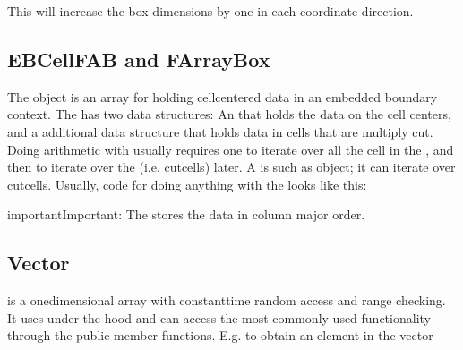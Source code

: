 \documentclass[letterpaper,10pt,english]{sphinxmanual}
\begin{document}
\sphinxAtStartPar
This will increase the box dimensions by one in each coordinate direction.


\subsection{EBCellFAB and FArrayBox}
\label{\detokenize{Source/ChomboBasics:ebcellfab-and-farraybox}}
\sphinxAtStartPar
The  object is an array for holding cell\sphinxhyphen{}centered data in an embedded boundary context.
The  has two data structures: An  that holds the data on the cell centers, and a additional data structure that holds data in cells that are multiply cut.
Doing arithmetic with  usually requires one to iterate over all the cell in the , and then to iterate over the  (i.e. cut\sphinxhyphen{}cells) later.
A  is such as object; it can iterate over cut\sphinxhyphen{}cells.
Usually, code for doing anything with the  looks like this:

\begin{sphinxVerbatim}[commandchars=\\\{\},formatcom=\scriptsize]

    
\end{sphinxVerbatim}

\begin{sphinxadmonition}{important}{Important:}
\sphinxAtStartPar
The  stores the data in column major order.
\end{sphinxadmonition}


\subsection{Vector}
\label{\detokenize{Source/ChomboBasics:vector}}
\sphinxAtStartPar
{} is a one\sphinxhyphen{}dimensional array with constant\sphinxhyphen{}time random access and range checking.
It uses  under the hood and can access the most commonly used  functionality through the public member functions.
E.g. to obtain an element in the vector
\end{document}
